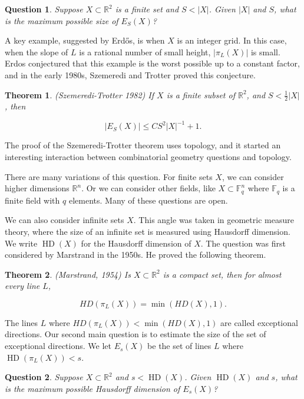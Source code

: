 \documentclass[12pt]{amsart}
\newtheorem{theorem}{Theorem}[section]
\newcommand{\FF}{\mathbb{F}}
\newcommand{\RR}{\mathbb{R}}
\DeclareMathOperator{\HD}{HD}
\newtheorem{ques}{Question}
\begin{document}
\begin{ques} \label{q1} Suppose $X \subset \RR^2$ is a finite set and $S < |X|$.  Given $|X|$ and $S$,  what is the maximum possible size of $E_S(X)$?  
\end{ques}

A key example,  suggested by Erd{\H o}s,  is when $X$ is an integer grid.   In this case,  when the slope of $L$ is a rational number of small height,  $|\pi_L(X)|$ is small.   Erdos conjectured that this example is the worst possible up to a constant factor,  and in the early 1980s,  Szemeredi and Trotter proved this conjecture.

\begin{theorem} \label{st} (Szemeredi-Trotter 1982) If $X$ is a finite subset of $\RR^2$,  and $S < \frac{1}{2} |X|$,  then

$$|E_S(X)| \le C S^2 |X|^{-1} + 1. $$

\end{theorem}

The proof of the Szemeredi-Trotter theorem uses topology,  and it started an interesting interaction between combinatorial geometry questions and topology.  

There are many variations of this question.  For finite sets $X$,  we can consider higher dimensions $\RR^n$.  Or we can consider other fields, like $X \subset \FF_q^n$ where $\FF_q$ is a finite field with $q$ elements.   Many of these questions are open.  

We can also consider infinite sets $X$. This angle was taken in geometric measure theory,  where the size of an infinite set is measured using Hausdorff dimension.   We write $\HD(X)$ for the Hausdorff dimension of $X$.    The question was first considered by Marstrand in the 1950s.  He proved the following theorem.

\begin{theorem} (Marstrand, 1954) Is $X \subset \RR^2$ is a compact set,  then for almost every line $L$,  

$$ HD( \pi_L(X) ) = \min( HD(X),  1). $$

\end{theorem}

The lines $L$ where $HD(\pi_L(X) ) < \min( HD(X),  1)$ are called exceptional directions.   Our second main question is to estimate the size of the set of exceptional directions.  We let $E_s(X)$ be the set of lines $L$ where $\HD(\pi_L(X)) < s$.   

\begin{ques} \label{q2} Suppose $X \subset \RR^2$ and $s < \HD(X)$.  
Given $\HD(X)$ and $s$,  what is the maximum possible Hausdorff dimension of $E_s(X)$?
\end{ques}
\end{document}
